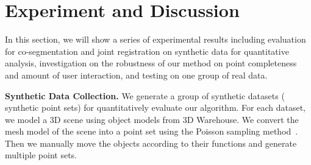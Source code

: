\section{Experiment and Discussion}
\label{sec:results}
In this section, we will show a series of experimental results including evaluation for co-segmentation and joint registration on synthetic data for quantitative analysis, investigation on the robustness of our method on point completeness and amount of user interaction, and testing on one group of real data.

\noindent \textbf{Synthetic Data Collection.} 
We generate a group of synthetic datasets ( synthetic point sets) for quantitatively evaluate our algorithm. 
%
For each dataset, we model a 3D scene using object models from 3D Warehouse.
We convert the mesh model of the scene into a point set using the Poisson sampling method~\cite{PossionSampling}.
%
Then we manually move the objects according to their functions and generate multiple point sets. 

